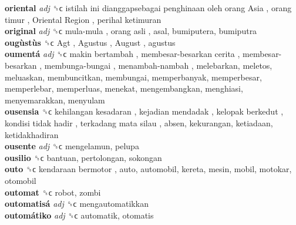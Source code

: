 \textbf{oriental} \emph{adj}  ␝ϲ   istilah ini dianggapsebagai penghinaan oleh orang Asia ,  orang timur ,  Oriental Region ,  perihal ketimuran   \\
\textbf{original} \emph{adj}  ␝ϲ   mula-mula ,  orang asli , asal, bumiputera, bumiputra  \\
\textbf{ougùstùs} ␝ϲ   Agt ,  Agustus ,  August , agustus  \\
\textbf{oumentá} \emph{adj}  ␝ϲ   makin bertambah ,  membesar-besarkan cerita ,  membesar-besarkan ,  membunga-bungai ,  menambah-nambah , melebarkan, meletos, meluaskan, membuncitkan, membungai, memperbanyak, memperbesar, memperlebar, memperluas, menekat, mengembangkan, menghiasi, menyemarakkan, menyulam  \\
\textbf{ousensia} ␝ϲ   kehilangan kesadaran ,  kejadian mendadak ,  kelopak berkedut ,  kondisi tidak hadir ,  terkadang mata silau , absen, kekurangan, ketiadaan, ketidakhadiran  \\
\textbf{ousente} \emph{adj}  ␝ϲ  mengelamun, pelupa  \\
\textbf{ousilio} ␝ϲ  bantuan, pertolongan, sokongan  \\
\textbf{outo} ␝ϲ   kendaraan bermotor , auto, automobil, kereta, mesin, mobil, motokar, otomobil  \\
\textbf{outomat} ␝ϲ  robot, zombi  \\
\textbf{outomatisá} \emph{adj}  ␝ϲ  mengautomatikkan  \\
\textbf{outomátiko} \emph{adj}  ␝ϲ  automatik, otomatis  \\
